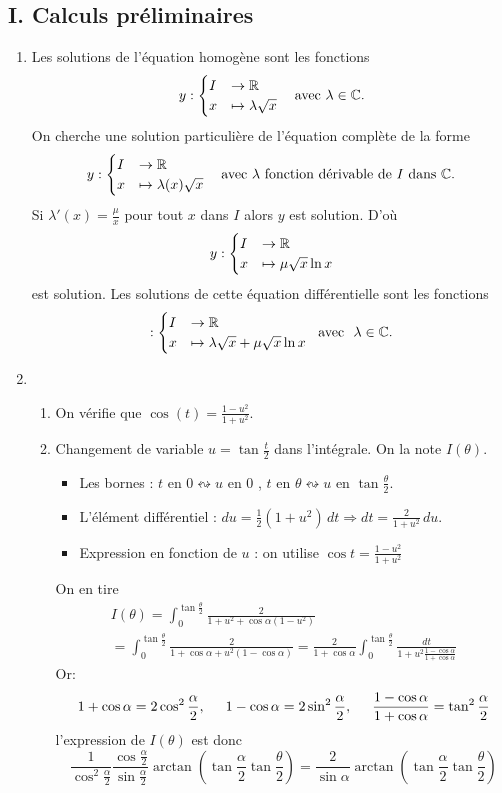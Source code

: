 
 \subsection*{I. Calculs préliminaires}
\begin{enumerate}
  \item Les solutions de l'équation homogène sont les fonctions 
\[
y : \begin{cases}I &\rightarrow \mathbb{R} \\ x &\mapsto \lambda \sqrt x \end{cases}\quad\text{avec}\ \lambda\in\mathbb{C}.  
\]
On cherche une solution  particulière de l'équation complète de la forme  
\[
y : \begin{cases}I &\rightarrow \mathbb{R} \\ x &\mapsto \lambda(x) \sqrt x \end{cases}\quad\text{avec $\lambda$ fonction dérivable de $I$ dans $\mathbb{C}$}.
\]
Si $\lambda'(x)=\frac \mu x$ pour tout $x$ dans $I$ alors $y$ est solution. D'où
$$y : \begin{cases}I &\rightarrow \mathbb{R} \\ x &\mapsto \mu\sqrt x\ln x \end{cases}$$ est solution.
Les solutions de cette équation différentielle sont les fonctions 
\[
: \begin{cases}I &\rightarrow \mathbb{R} \\ x &\mapsto \lambda \sqrt x+\mu\sqrt x\ln x \end{cases}\;\text{ avec }\ \lambda \in\mathbb{C}.
\]

  \item 
  \begin{enumerate}
  \item On vérifie que $\cos(t) = \frac{1-u^{2}}{1+u^{2}}$.
  \item Changement de variable $u = \tan \frac{t}{2}$ dans l'intégrale. On la note $I(\theta)$.
\begin{itemize}
  \item Les bornes : $t$ en $0\leftrightsquigarrow u \text{ en } 0$ , $t \text{ en }\theta \leftrightsquigarrow u \text{ en } \tan \frac{\theta}{2}$.
  \item L'élément différentiel : $du = \frac{1}{2}(1+u^2)\,dt \Rightarrow dt =\frac{2}{1+u^2}\,du$.
  \item Expression en fonction de $u$ : on utilise $\cos t = \frac{1-u^2}{1+u^2}$
\end{itemize}
On en tire
\begin{multline*}
I(\theta) = \int_0^{\tan\frac{\theta}{2}}\frac{2}{1+u^2+\cos\alpha(1-u^2)}\\
= \int_0^{\tan\frac{\theta}{2}}\frac{2}{1+\cos\alpha +u^2(1-\cos\alpha)}
= \frac{2}{1+\cos\alpha}\int_0^{\tan\frac{\theta}{2}}\frac{dt}{1+u^2\frac{1-\cos \alpha}{1+\cos \alpha}}
\end{multline*}
Or:
\begin{displaymath}
  1+\cos \alpha = 2 \cos^2 \frac{\alpha}{2},\hspace{0.5cm} 1-\cos\alpha = 2\sin^2\frac{\alpha}{2}
  ,\hspace{0.5cm } \frac{1-\cos \alpha}{1+\cos \alpha} = \tan^2\frac{\alpha}{2}
\end{displaymath}
l'expression de $I(\theta)$ est donc
\begin{displaymath}
\frac{1}{\cos^2 \frac{\alpha}{2}}\frac{\cos\frac{\alpha}{2}}{\sin \frac{\alpha}{2}}\arctan\left(\tan\frac{\alpha}{2}\tan\frac{\theta}{2} \right) 
  = \frac{2}{\sin \alpha}\arctan\left(\tan\frac{\alpha}{2}\tan\frac{\theta}{2} \right)
\end{displaymath}


\end{enumerate}
\end{enumerate}
